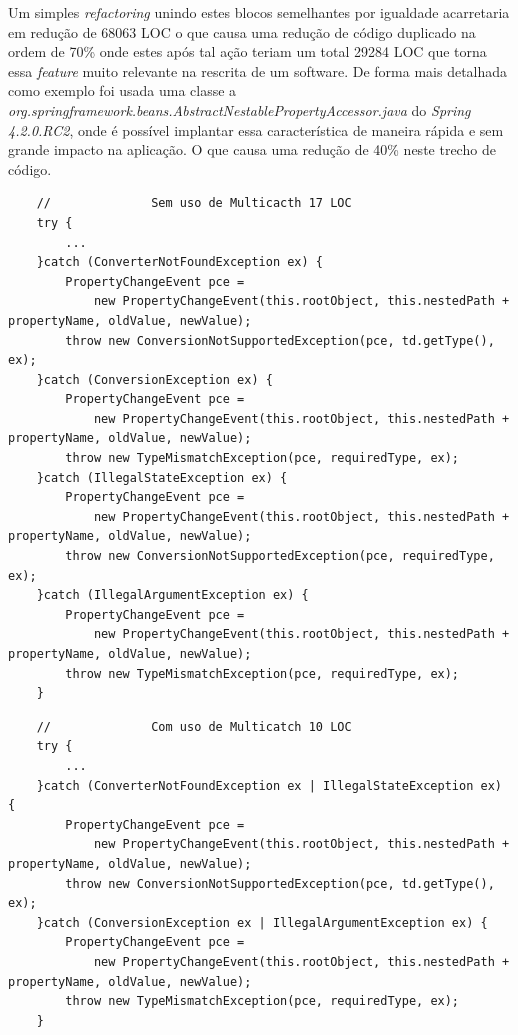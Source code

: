 Um simples \textit{refactoring} unindo estes blocos semelhantes por igualdade acarretaria em redução de 68063 \acs{LOC}  o que  causa uma redução de código duplicado na ordem de 70\% onde estes após tal ação teriam um total 29284 \acs{LOC} que torna essa \textit{feature} muito relevante na rescrita de um software. De forma mais detalhada como exemplo foi usada uma classe a \textit{org.springframework.beans.AbstractNestablePropertyAccessor.java} do \textit{Spring 4.2.0.RC2}, onde é possível implantar essa característica de maneira rápida e sem grande impacto na aplicação. O que causa uma redução de 40\% neste trecho de código.\\
\begin{lstlisting}
	//              Sem uso de Multicacth 17 LOC
	try {
		...
	}catch (ConverterNotFoundException ex) {
		PropertyChangeEvent pce =
			new PropertyChangeEvent(this.rootObject, this.nestedPath + propertyName, oldValue, newValue);
		throw new ConversionNotSupportedException(pce, td.getType(), ex);
	}catch (ConversionException ex) {
		PropertyChangeEvent pce =
			new PropertyChangeEvent(this.rootObject, this.nestedPath + propertyName, oldValue, newValue);
		throw new TypeMismatchException(pce, requiredType, ex);
	}catch (IllegalStateException ex) {
		PropertyChangeEvent pce =
			new PropertyChangeEvent(this.rootObject, this.nestedPath + propertyName, oldValue, newValue);
		throw new ConversionNotSupportedException(pce, requiredType, ex);
	}catch (IllegalArgumentException ex) {
		PropertyChangeEvent pce =
			new PropertyChangeEvent(this.rootObject, this.nestedPath + propertyName, oldValue, newValue);
		throw new TypeMismatchException(pce, requiredType, ex);
	}
\end{lstlisting}


\begin{lstlisting}
	//              Com uso de Multicatch 10 LOC
	try {
		...
	}catch (ConverterNotFoundException ex | IllegalStateException ex) {
		PropertyChangeEvent pce =
			new PropertyChangeEvent(this.rootObject, this.nestedPath + propertyName, oldValue, newValue);
		throw new ConversionNotSupportedException(pce, td.getType(), ex);
	}catch (ConversionException ex | IllegalArgumentException ex) {
		PropertyChangeEvent pce =
			new PropertyChangeEvent(this.rootObject, this.nestedPath + propertyName, oldValue, newValue);
		throw new TypeMismatchException(pce, requiredType, ex);
	}	
\end{lstlisting}



